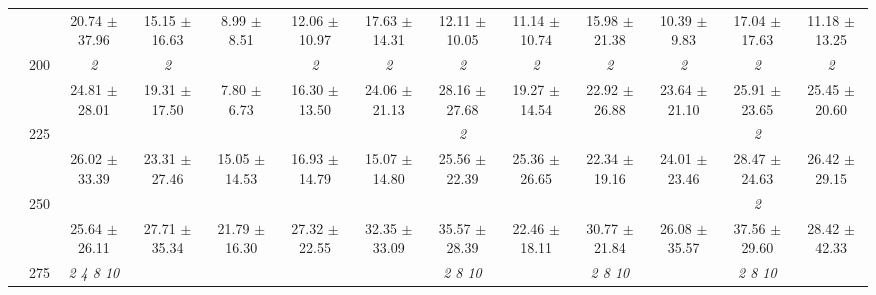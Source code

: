 \begin{table}[h]
{\begin{tabular}{
        ccccccccccccc}
 & & \cellcolor[HTML]{EFEFEF} 20.74 $\pm$ 37.96& \cellcolor[HTML]{EFEFEF} 15.15 $\pm$ 16.63& \cellcolor[HTML]{EFEFEF} 8.99 $\pm$ 8.51& \cellcolor[HTML]{EFEFEF} 12.06 $\pm$ 10.97& \cellcolor[HTML]{EFEFEF} 17.63 $\pm$ 14.31& \cellcolor[HTML]{EFEFEF} 12.11 $\pm$ 10.05& \cellcolor[HTML]{EFEFEF} 11.14 $\pm$ 10.74& \cellcolor[HTML]{EFEFEF} 15.98 $\pm$ 21.38& \cellcolor[HTML]{EFEFEF} 10.39 $\pm$ 9.83& \cellcolor[HTML]{EFEFEF} 17.04 $\pm$ 17.63& \cellcolor[HTML]{EFEFEF} 11.18 $\pm$ 13.25 \\ 
 & \multirow{2}{*}{200}& \textit{ 2 }& \textit{ 2 }& & \textit{ 2 }& \textit{ 2 }& \textit{ 2 }& \textit{ 2 }& \textit{ 2 }& \textit{ 2 }& \textit{ 2 }& \textit{ 2 } \\ 
 & & 24.81 $\pm$ 28.01& 19.31 $\pm$ 17.50& 7.80 $\pm$ 6.73& 16.30 $\pm$ 13.50& 24.06 $\pm$ 21.13& 28.16 $\pm$ 27.68& 19.27 $\pm$ 14.54& 22.92 $\pm$ 26.88& 23.64 $\pm$ 21.10& 25.91 $\pm$ 23.65& 25.45 $\pm$ 20.60 \\ 
 & \multirow{2}{*}{225}& \cellcolor[HTML]{EFEFEF} & \cellcolor[HTML]{EFEFEF} & \cellcolor[HTML]{EFEFEF} & \cellcolor[HTML]{EFEFEF} & \cellcolor[HTML]{EFEFEF} & \cellcolor[HTML]{EFEFEF} \textit{ 2 }& \cellcolor[HTML]{EFEFEF} & \cellcolor[HTML]{EFEFEF} & \cellcolor[HTML]{EFEFEF} & \cellcolor[HTML]{EFEFEF} \textit{ 2 }& \cellcolor[HTML]{EFEFEF}  \\ 
 & & \cellcolor[HTML]{EFEFEF} 26.02 $\pm$ 33.39& \cellcolor[HTML]{EFEFEF} 23.31 $\pm$ 27.46& \cellcolor[HTML]{EFEFEF} 15.05 $\pm$ 14.53& \cellcolor[HTML]{EFEFEF} 16.93 $\pm$ 14.79& \cellcolor[HTML]{EFEFEF} 15.07 $\pm$ 14.80& \cellcolor[HTML]{EFEFEF} 25.56 $\pm$ 22.39& \cellcolor[HTML]{EFEFEF} 25.36 $\pm$ 26.65& \cellcolor[HTML]{EFEFEF} 22.34 $\pm$ 19.16& \cellcolor[HTML]{EFEFEF} 24.01 $\pm$ 23.46& \cellcolor[HTML]{EFEFEF} 28.47 $\pm$ 24.63& \cellcolor[HTML]{EFEFEF} 26.42 $\pm$ 29.15 \\ 
 & \multirow{2}{*}{250}& & & & & & & & & & \textit{ 2 }&  \\ 
 & & 25.64 $\pm$ 26.11& 27.71 $\pm$ 35.34& 21.79 $\pm$ 16.30& 27.32 $\pm$ 22.55& 32.35 $\pm$ 33.09& 35.57 $\pm$ 28.39& 22.46 $\pm$ 18.11& 30.77 $\pm$ 21.84& 26.08 $\pm$ 35.57& 37.56 $\pm$ 29.60& 28.42 $\pm$ 42.33 \\ 
 & \multirow{2}{*}{275}& \cellcolor[HTML]{EFEFEF} \textit{  2  4  8 10 }& \cellcolor[HTML]{EFEFEF} & \cellcolor[HTML]{EFEFEF} & \cellcolor[HTML]{EFEFEF} & \cellcolor[HTML]{EFEFEF} & \cellcolor[HTML]{EFEFEF} \textit{  2  8 10 }& \cellcolor[HTML]{EFEFEF} & \cellcolor[HTML]{EFEFEF} \textit{  2  8 10 }& \cellcolor[HTML]{EFEFEF} & \cellcolor[HTML]{EFEFEF} \textit{  2  8 10 }& \cellcolor[HTML]{EFEFEF}  \\ 

\end{tabular}}
\end{table}
